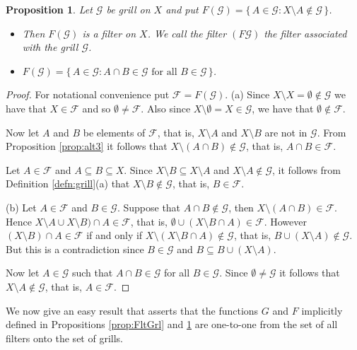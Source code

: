 \documentclass[12pt]{article}
\theoremstyle{plain}
\newtheorem{prop}[thm]{Proposition}
\theoremstyle{definition}
\newcommand{\calF}{\mathcal{F}}
\newcommand{\calG}{\mathcal{G}}
\begin{document}
\begin{prop}
  \label{prop:GrlFlt}
  Let $\calG$ be grill on $X$ and put $F(\calG) = \{\, A \in \calG : X \setminus A \not\in \calG \,\}$.
  \begin{itemize}
    \item[(a)] Then $F(\calG)$ is a filter on $X$.
      We call the filter $(F\calG)$ the \textsl{filter associated with the grill $\calG$}.
    \item[(b)] $F(\calG) = \{\, A \in \calG : \mbox{$A \cap B \in \calG$ for all $B \in \calG$} \,\}$.
  \end{itemize}
\end{prop}
\begin{proof}
  For notational convenience put $\calF = F(\calG)$.
  (a)
  Since $X \setminus X = \emptyset \not\in \calG$ we have that $X \in \calF$ and so $\emptyset \ne \calF$.
  Also since $X \setminus \emptyset = X \in \calG$, we have that $\emptyset \not\in \calF$.

  Now let $A$ and $B$ be elements of $\calF$, that is, $X \setminus A$ and $X \setminus B$ are not in $\calG$.
  From Proposition \ref{prop:alt3} it follows that $X \setminus (A \cap B) \not\in \calG$, that is, $A \cap B \in \calF$. 

  Let $A \in \calF$ and $A \subseteq B \subseteq X$.
  Since $X \setminus B \subseteq X \setminus A$ and $X \setminus A \not\in \calG$, it follows from Definition \ref{defn:grill}(a) that $X \setminus B \not\in \calG$, that is, $B \in \calF$.

  (b)
  Let $A \in \calF$ and $B \in \calG$.
  Suppose that $A \cap B \not\in \calG$, then $X \setminus (A \cap B) \in \calF$.
  Hence $X \setminus A \cup X \setminus B) \cap A \in \calF$, that is, $\emptyset \cup (X \setminus B \cap A) \in \calF$.
  However $(X \setminus B) \cap A \in \calF$ if and only if $X \setminus (X \setminus B \cap A) \not\in \calG$, that is, $B \cup (X \setminus A) \not\in \calG$.
  But this is a contradiction since $B \in \calG$ and $B \subseteq B \cup (X \setminus A)$.
  
  Now let $A \in \calG$ such that $A \cap B \in \calG$ for all $B \in \calG$.
  Since $\emptyset \ne \calG$ it follows that $X \setminus A \not\in \calG$, that is, $A \in \calF$.
\end{proof}

We now give an easy result that asserts that the functions $G$ and $F$ implicitly defined in Propositions \ref{prop:FltGrl} and \ref{prop:GrlFlt} are one-to-one from the set of all filters onto the set of grills.
\end{document}
